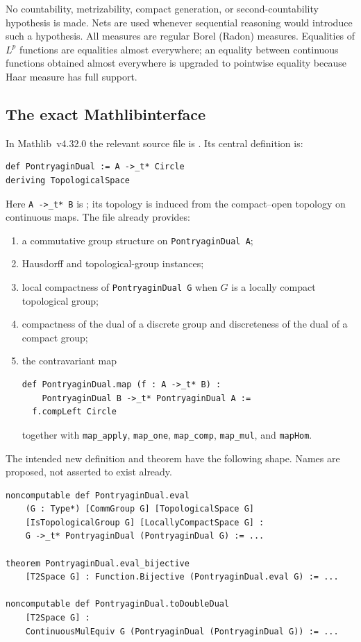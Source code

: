 \documentclass[11pt]{article}
\theoremstyle{definition}
\theoremstyle{remark}
\newcommand{\Lp}[1]{L^{#1}}
\newcommand{\mathlib}{\textsf{Mathlib}}
\begin{document}
No countability, metrizability, compact generation, or second-countability hypothesis is
made.  Nets are used whenever sequential reasoning would introduce such a hypothesis.
All measures are regular Borel (Radon) measures.  Equalities of $\Lp p$ functions are
equalities almost everywhere; an equality between continuous functions obtained almost
everywhere is upgraded to pointwise equality because Haar measure has full support.

\subsection{The exact \mathlib interface}

In \mathlib~v4.32.0 the relevant source file is
.  Its central definition is:

\begin{lstlisting}
def PontryaginDual := A ->_t* Circle
deriving TopologicalSpace
\end{lstlisting}

Here \texttt{A ->\_t* B} is ; its topology is induced
from the compact--open topology on continuous maps.  The file already provides:

\begin{enumerate}[label=(M\arabic*)]
\item a commutative group structure on \texttt{PontryaginDual A};
\item Hausdorff and topological-group instances;
\item local compactness of \texttt{PontryaginDual G} when $G$ is a locally compact
  topological group;
\item compactness of the dual of a discrete group and discreteness of the dual of a
  compact group;
\item the contravariant map
\begin{lstlisting}
def PontryaginDual.map (f : A ->_t* B) :
    PontryaginDual B ->_t* PontryaginDual A :=
  f.compLeft Circle
\end{lstlisting}
  together with \texttt{map\_apply}, \texttt{map\_one}, \texttt{map\_comp},
  \texttt{map\_mul}, and \texttt{mapHom}.
\end{enumerate}

The intended new definition and theorem have the following shape.  Names are proposed,
not asserted to exist already.

\begin{lstlisting}
noncomputable def PontryaginDual.eval
    (G : Type*) [CommGroup G] [TopologicalSpace G]
    [IsTopologicalGroup G] [LocallyCompactSpace G] :
    G ->_t* PontryaginDual (PontryaginDual G) := ...

theorem PontryaginDual.eval_bijective
    [T2Space G] : Function.Bijective (PontryaginDual.eval G) := ...

noncomputable def PontryaginDual.toDoubleDual
    [T2Space G] :
    ContinuousMulEquiv G (PontryaginDual (PontryaginDual G)) := ...
\end{lstlisting}
\end{document}
